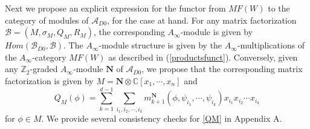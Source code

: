 \documentclass[a4paper,11pt]{article}
\def\cA{\mathcal{A}}
\newcommand{\Af}{{A_\infty}}
\numberwithin{equation}{section}
\begin{document}

Next we propose an explicit expression for the functor from $MF(W)$ to the 
category of modules of $\cA_{D0}$, for the case at 
hand. For any matrix factorization $\mathcal{B}=(M,\sigma_M, Q_M, 
R_M)$, the corresponding $\Af$-module is given by 
$Hom(\mathcal{B}_{D0},\mathcal{B})$.
The $\Af$-module structure is given by the $\Af$-multiplications of the 
$\Af$-category $MF(W)$ as described in (\ref{productsfunct}). Conversely, 
given any $\mathbb{Z}_2$-graded $\Af$-module $\mathbf{N}$ of $\cA_{D0}$, we 
propose that the corresponding matrix factorization is given by $M = \mathbf{N} 
\otimes \mathbb{C}[x_1,\cdots,x_n]$ and
\begin{equation}\label{QM}
Q_M (\phi) = \sum_{k = 1}^{d-1} \sum_{i_1,i_2,\cdots,i_k} m^\mathbf{N}_{k+1} 
(\phi,\psi_{i_1},\cdots,\psi_{i_k}) x_{i_1} x_{i_2} \cdots x_{i_k}
\end{equation}
for $\phi \in M$.
We provide several consistency checks for \eqref{QM} in Appendix A.
\end{document}
